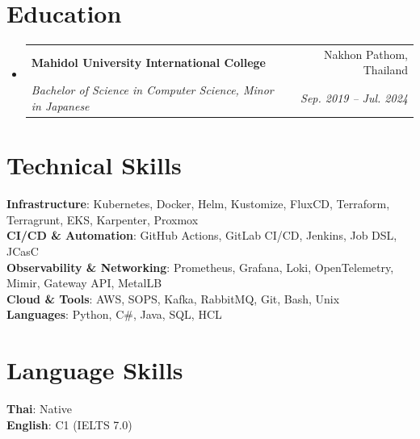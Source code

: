 \documentclass[letterpaper,11pt]{article}
\makeatletter
\newcommand{\resumeItem}[1]{
  \item\small{
    {#1 \vspace{-2pt}}
  }
}
\newcommand{\resumeSubheading}[4]{
  \vspace{-2pt}\item
    \begin{tabular*}{0.97\textwidth}[t]{l@{\extracolsep{\fill}}r}
      \textbf{#1} & #2 \\
      \textit{\small#3} & \textit{\small #4} \\
    \end{tabular*}\vspace{-7pt}
}
\newcommand{\resumeProjectHeading}[2]{
    \item
    \begin{tabular*}{0.97\textwidth}{l@{\extracolsep{\fill}}r}
      \small#1 & #2 \\
    \end{tabular*}\vspace{-7pt}
}
\newcommand{\resumeSubHeadingListStart}{\begin{itemize}[leftmargin=0.15in, label={}]}
\newcommand{\resumeSubHeadingListEnd}{\end{itemize}}
\newcommand{\resumeItemListStart}{\begin{itemize}}
\newcommand{\resumeItemListEnd}{\end{itemize}\vspace{-5pt}}
\makeatother
\begin{document}
\section{Education}
  \resumeSubHeadingListStart
    \resumeSubheading
      {Mahidol University International College}{Nakhon Pathom, Thailand}
      {Bachelor of Science in Computer Science, Minor in Japanese}{Sep. 2019 -- Jul. 2024}
  \resumeSubHeadingListEnd

\section{Technical Skills}
  \begin{itemize}[leftmargin=0.15in, label={}]
    \small{\item{
      \textbf{Infrastructure}{: Kubernetes, Docker, Helm, Kustomize, FluxCD, Terraform, Terragrunt, EKS, Karpenter, Proxmox} \\
      \textbf{CI/CD \& Automation}{: GitHub Actions, GitLab CI/CD, Jenkins, Job DSL, JCasC} \\
      \textbf{Observability \& Networking}{: Prometheus, Grafana, Loki, OpenTelemetry, Mimir, Gateway API, MetalLB} \\
      \textbf{Cloud \& Tools}{: AWS, SOPS, Kafka, RabbitMQ, Git, Bash, Unix} \\
      \textbf{Languages}{: Python, C\#, Java, SQL, HCL}
    }}
  \end{itemize}


\section{Language Skills}
 \begin{itemize}[leftmargin=0.15in, label={}]
    \small{\item{
     \textbf{Thai}{: Native} \\
     \textbf{English}{: C1 (IELTS 7.0)} \\
    }}
 \end{itemize}


\end{document}
